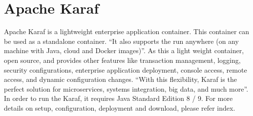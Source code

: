 \section{Apache Karaf}

Apache Karaf is a lightweight enterprise application container. This
container can be used as a standalone container.  ``It also supports
the run anywhere (on any machine with Java, cloud and Docker
images)''\cite{hid-sp18-514-apachekaraf}.  As this a light weight
container, open source, and provides other features like transaction
management\cite{karaf_transaction}, logging, security configurations,
enterprise application deployment, console access, remote access, and
dynamic configuration changes. ``With this flexibility, Karaf is the
perfect solution for microservices, systems integration, big data, and
much more''\cite{hid-sp18-514-apachekaraf}.  In order to run the Karaf,
it requires Java Standard Edition 8 / 9. For more details on setup,
configuration, deployment and download, please refer index.



